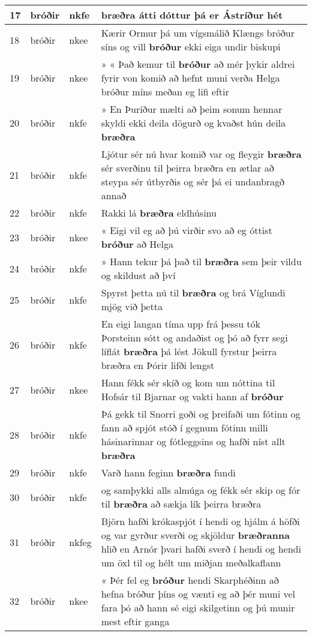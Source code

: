 \documentclass{article}
\begin{document}
\begin{longtable}{p{1cm}|p{1cm}|p{1cm}|p{13cm}}
\hline
17&bróðir&nkfe& \textbf{bræðra} átti dóttur þá er Ástríður hét\\
\hline
18&bróðir&nkee&Kærir Ormur þá um vígsmálið Klængs bróður síns og vill \textbf{bróður} ekki eiga undir biskupi\\
\hline
19&bróðir&nkee&» « Það kemur til \textbf{bróður} að mér þykir aldrei fyrir von komið að hefnt muni verða Helga bróður míns meðan eg lifi eftir\\
\hline
20&bróðir&nkfe&» En Þuríður mælti að þeim sonum hennar skyldi ekki deila dögurð og kvaðst hún deila \textbf{bræðra} \\
\hline
21&bróðir&nkfe&Ljótur sér nú hvar komið var og fleygir \textbf{bræðra} sér sverðinu til þeirra bræðra en ætlar að steypa sér útbyrðis og sér þá ei undanbragð annað\\
\hline
22&bróðir&nkfe&Rakki lá \textbf{bræðra} eldhúsinu\\
\hline
23&bróðir&nkee&« Eigi vil eg að þú virðir svo að eg óttist \textbf{bróður} að Helga\\
\hline
24&bróðir&nkfe&» Hann tekur þá það til \textbf{bræðra} sem þeir vildu og skildust að því\\
\hline
25&bróðir&nkfe&Spyrst þetta nú til \textbf{bræðra} og brá Víglundi mjög við þetta\\
\hline
26&bróðir&nkfe&En eigi langan tíma upp frá þessu tók Þorsteinn sótt og andaðist og þó að fyrr segi líflát \textbf{bræðra} þá lést Jökull fyrstur þeirra bræðra en Þórir lifði lengst\\
\hline
27&bróðir&nkee&Hann fékk sér skíð og kom um nóttina til Hofsár til Bjarnar og vakti hann af \textbf{bróður} \\
\hline
28&bróðir&nkfe&Þá gekk til Snorri goði og þreifaði um fótinn og fann að spjót stóð í gegnum fótinn milli hásinarinnar og fótleggsins og hafði níst allt \textbf{bræðra} \\
\hline
29&bróðir&nkfe&Varð hann feginn \textbf{bræðra} fundi\\
\hline
30&bróðir&nkfe&og samþykki alls almúga og fékk sér skip og fór til \textbf{bræðra} að sækja lík þeirra bræðra\\
\hline
31&bróðir&nkfeg&Björn hafði krókaspjót í hendi og hjálm á höfði og var gyrður sverði og skjöldur \textbf{bræðranna} hlið en Arnór þvari hafði sverð í hendi og hendi um öxl til og hélt um miðjan meðalkaflann\\
\hline
32&bróðir&nkee&« Þér fel eg \textbf{bróður} hendi Skarphéðinn að hefna bróður þíns og vænti eg að þér muni vel fara þó að hann sé eigi skilgetinn og þú munir mest eftir ganga\\

\end{longtable}
\end{document}
